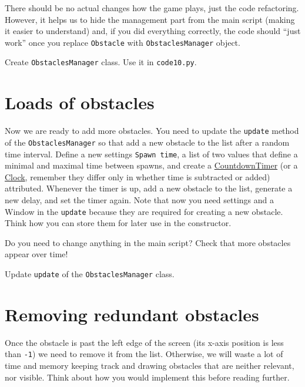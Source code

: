 \documentclass[
]{book}
\begin{document}
There should be no actual changes how the game plays, just the code refactoring. However, it helps us to hide the management part from the main script (making it easier to understand) and, if you did everything correctly, the code should ``just work'' once you replace \texttt{Obstacle} with \texttt{ObstaclesManager} object.

Create \texttt{ObstaclesManager} class.
Use it in \texttt{code10.py}.

\hypertarget{loads-of-obstacles}{%
\section{Loads of obstacles}\label{loads-of-obstacles}}

Now we are ready to add more obstacles. You need to update the \texttt{update} method of the \texttt{ObstaclesManager} so that add a new obstacle to the list after a random time interval. Define a new settings \texttt{Spawn\ time}, a list of two values that define a minimal and maximal time between spawns, and create a \href{https://psychopy.org/api/clock.html\#psychopy.clock.CountdownTimer}{CountdownTimer} (or a \href{https://psychopy.org/api/clock.html\#psychopy.clock.Clock}{Clock}, remember they differ only in whether time is subtracted or added) attributed. Whenever the timer is up, add a new obstacle to the list, generate a new delay, and set the timer again. Note that now you need settings and a Window in the \texttt{update} because they are required for creating a new obstacle. Think how you can store them for later use in the constructor.

Do you need to change anything in the main script? Check that more obstacles appear over time!

Update \texttt{update} of the \texttt{ObstaclesManager} class.

\hypertarget{removing-redundant-obstacles}{%
\section{Removing redundant obstacles}\label{removing-redundant-obstacles}}

Once the obstacle is past the left edge of the screen (its x-axis position is less than \texttt{-1}) we need to remove it from the list. Otherwise, we will waste a lot of time and memory keeping track and drawing obstacles that are neither relevant, nor visible. Think about how you would implement this before reading further.
\end{document}
